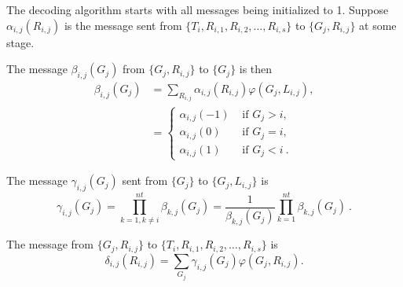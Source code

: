 {The decoding algorithm starts with all messages being  initialized
to 1. Suppose $\alpha_{i,j}(R_{i,j})$ is the message sent from
$\{T_i, R_{i,1},R_{i,2},\dots, R_{i,s}\}$ to $\{G_j,R_{i,j}\}$ at
some stage.

The message $\beta_{i,j}(G_j)$ from $\{G_j,R_{i,j}\}$ to $\{G_j\}$
is then
\begin{eqnarray*}
\beta_{i,j}(G_j)&=\sum_{R_{i,j}}\alpha_{i,j}(R_{i,j})\varphi
(G_j,L_{i,j}),\\
{}&=\left\{ \begin{array}{ccc}\alpha_{i,j}(-1) & \text{ if }
G_j>i,\\
\alpha_{i,j}(0) & \text{ if }
G_j=i,\\
\alpha_{i,j}(1) & \text{ if } G_j<i~.
\end{array}\right.
\end{eqnarray*}

The message $\gamma_{i,j}(G_j)$ sent from $\{G_j\}$ to
$\{G_j,L_{i,j}\}$ is
\begin{equation}
\gamma_{i,j}(G_j)=\prod_{k=1,k\neq
i}^{nt}\beta_{k,j}(G_j)=\frac{1}{\beta_{k,j}(G_j)}\prod_{k=1}^{nt}\beta_{k,j}(G_j)~.
\end{equation}

The message from $\{G_j,R_{i,j}\}$ to $\{T_i,
R_{i,1},R_{i,2},\dots, R_{i,s}\}$  is
\begin{equation}
\delta_{i,j}(R_{i,j})=\sum_{G_j}\gamma_{i,j}(G_j)\varphi(G_j,R_{i,j}).
\end{equation}

}
